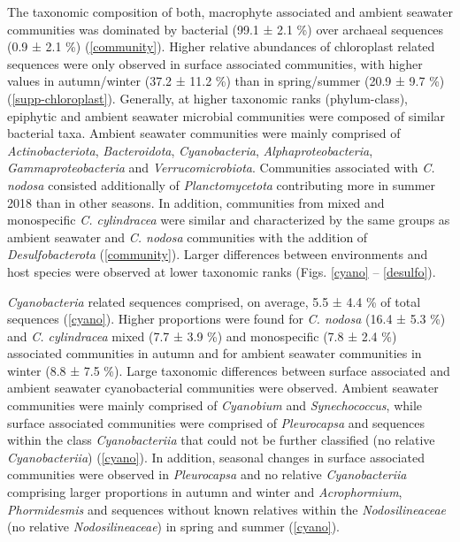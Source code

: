\documentclass[
  12pt,
]{article}
\begin{document}
The taxonomic composition of both, macrophyte associated and ambient
seawater communities was dominated by bacterial (99.1 ± 2.1
\si{\percent}) over archaeal sequences (0.9 ± 2.1 \si{\percent})
(\autoref{community}). Higher relative abundances of chloroplast related
sequences were only observed in surface associated communities, with
higher values in autumn/winter (37.2 ± 11.2 \si{\percent}) than in
spring/summer (20.9 ± 9.7 \si{\percent}) (\autoref{supp-chloroplast}).
Generally, at higher taxonomic ranks (phylum-class), epiphytic and
ambient seawater microbial communities were composed of similar
bacterial taxa. Ambient seawater communities were mainly comprised of
\emph{Actinobacteriota}, \emph{Bacteroidota}, \emph{Cyanobacteria},
\emph{Alphaproteobacteria}, \emph{Gammaproteobacteria} and
\emph{Verrucomicrobiota}. Communities associated with \emph{C. nodosa}
consisted additionally of \emph{Planctomycetota} contributing more in
summer 2018 than in other seasons. In addition, communities from mixed
and monospecific \emph{C. cylindracea} were similar and characterized by
the same groups as ambient seawater and \emph{C. nodosa} communities
with the addition of \emph{Desulfobacterota} (\autoref{community}).
Larger differences between environments and host species were observed
at lower taxonomic ranks (Figs. \ref{cyano} -- \ref{desulfo}).

\emph{Cyanobacteria} related sequences comprised, on average, 5.5 ± 4.4
\si{\percent} of total sequences (\autoref{cyano}). Higher proportions
were found for \emph{C. nodosa} (16.4 ± 5.3 \si{\percent}) and \emph{C.
cylindracea} mixed (7.7 ± 3.9 \si{\percent}) and monospecific (7.8 ± 2.4
\si{\percent}) associated communities in autumn and for ambient seawater
communities in winter (8.8 ± 7.5 \si{\percent}). Large taxonomic
differences between surface associated and ambient seawater
cyanobacterial communities were observed. Ambient seawater communities
were mainly comprised of \emph{Cyanobium} and \emph{Synechococcus},
while surface associated communities were comprised of
\emph{Pleurocapsa} and sequences within the class \emph{Cyanobacteriia}
that could not be further classified (no relative \emph{Cyanobacteriia})
(\autoref{cyano}). In addition, seasonal changes in surface associated
communities were observed in \emph{Pleurocapsa} and no relative
\emph{Cyanobacteriia} comprising larger proportions in autumn and winter
and \emph{Acrophormium}, \emph{Phormidesmis} and sequences without known
relatives within the \emph{Nodosilineaceae} (no relative
\emph{Nodosilineaceae}) in spring and summer (\autoref{cyano}).
\end{document}

